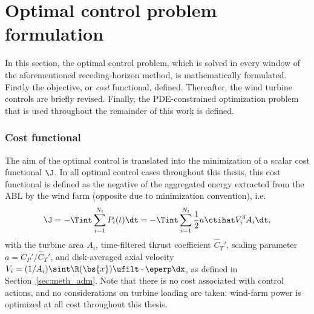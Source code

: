 \section{Optimal control problem formulation}\label{sec:problem_formulation}

In this section, the optimal control problem, which is solved in every window of the aforementioned receding-horizon method, is mathematically formulated. Firstly the objective, or \emph{cost} functional, defined. Thereafter, the wind turbine controls are briefly revised. Finally, the PDE-constrained optimization problem that is used throughout the remainder of this work is defined. 

\subsubsection{Cost functional}
The aim of the optimal control is translated into the minimization of a scalar cost functional $\J$. In all optimal control cases throughout this thesis, this cost functional is defined as the negative of the aggregated energy extracted from the ABL by the wind farm (opposite due to minimization convention), i.e.
\begin{equation}\label{eq:costfunction}
	\J = - \Tint \sum_{i=1}^{N_t} P_i(t) \dt = - \Tint \sum_{i=1}^{N_t} \frac{1}{2} a \ctihat V_i^3 A_i \dt,
\end{equation}
with the turbine area $A_i$, time-filtered thrust coefficient $\widehat{C}_T'$, scaling parameter $a = C_P'/\widehat{C}_T'$, and disk-averaged axial velocity $V_i = (1/A_i) \sint  \R(\bs{x}) \ufilt \cdot \eperp \dx$, as defined in Section~\ref{sec:meth_adm}. Note that there is no cost associated with control actions, and no considerations on turbine loading are taken: wind-farm power is optimized at all cost throughout this thesis. 

